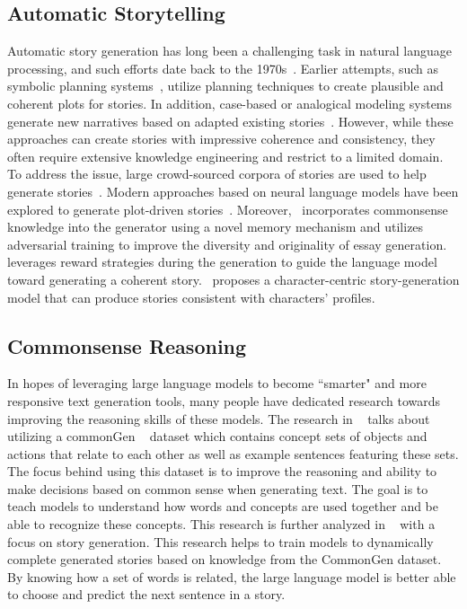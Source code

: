 \documentclass{article} %
\begin{document}
\subsection{Automatic Storytelling}
Automatic story generation has long been a challenging task in natural language processing, and such efforts date back to the 1970s~\cite{Meehan1977TALESPINAI}. Earlier attempts, such as symbolic planning systems~\cite{Riedl_2010}, utilize planning techniques to create plausible and coherent plots for stories. In addition, case-based or analogical modeling systems generate new narratives based on adapted existing stories~\cite{Gervs2005StoryPG}. However, while these approaches can create stories with impressive coherence and consistency, they often require extensive knowledge engineering and restrict to a limited domain. To address the issue, large crowd-sourced corpora of stories are used to help generate stories~\cite{10.1145/2362394.2362398,Li}. Modern approaches based on neural language models have been explored to generate plot-driven stories~\cite{fan-etal-2018-hierarchical}. Moreover,~\cite{yang-etal-2019-enhancing-topic} incorporates commonsense knowledge into the generator using a novel memory mechanism and utilizes adversarial training to improve the diversity and originality of essay generation.~\cite{Tambwekar2019ControllableNS} leverages reward strategies during the generation to guide the language model toward generating a coherent story.~\cite{Liu_Li_Yu_Huang_Liu_Zhao_Yan_2020} proposes a character-centric story-generation model that can produce stories consistent with characters' profiles. 

\subsection{Commonsense Reasoning}
In hopes of leveraging large language models to become ``smarter" and more responsive text generation tools, many people have dedicated research towards improving the reasoning skills of these models. The research in ~\cite{Lin_Zhou_Shen_Zhou_Bhagavatula_Choi_Ren_2020} talks about utilizing a commonGen ~\cite{lin2020commongen} dataset which contains concept sets of objects and actions that relate to each other as well as example sentences featuring these sets. The focus behind using this dataset is to improve the reasoning and ability to make decisions based on common sense when generating text. The goal is to teach models to understand how words and concepts are used together and be able to recognize these concepts. This research is further analyzed in ~\cite{Chen_Chen_Yu_2018} with a focus on story generation. This research helps to train models to dynamically complete generated stories based on knowledge from the CommonGen\cite{lin2019commongen} dataset. By knowing how a set of words is related, the large language model is better able to choose and predict the next sentence in a story.
\end{document}
